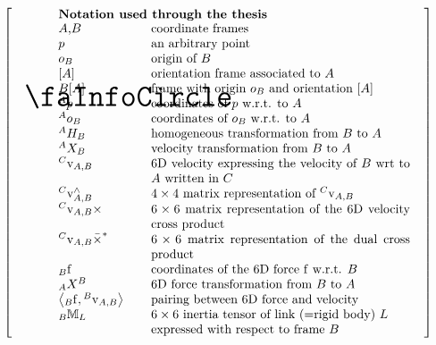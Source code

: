 \[
  \left[
      \begin{tabular}{@{\quad}m{.05\textwidth}@{\quad}m{.83\textwidth}}
        {\Huge \faInfoCircle} &
          \raggedright%
          \textbf{Notation used through the thesis} \par
          \begin{tabular}{@{}p{0.18\textwidth}p{0.60\textwidth}@{}}
          $A$,$B$        & coordinate frames \\
$p$            & an arbitrary point \\
$o_B$          & origin of $B$ \\
$[A]$          & orientation frame associated to $A$ \\
$B[A]$         & frame with origin $o_B$ 
                 and orientation $[A]$ \\
$\ls^Ap$       & coordinates of $p$ 
                 w.r.t. to $A$ \\
$\ls^Ao_B$     & coordinates of $o_B$ w.r.t. to $A$ \\
$\ls^AH_B$     & homogeneous transformation from $B$ to $A$ \\
$\ls^AX_B$     & velocity transformation 
                 from $B$ to $A$  \\
$\ls^C\rmv_{A,B}$ & 6D velocity expressing the velocity of $B$ wrt to $A$
                 written in $C$ \\
$\ls^C\rmv_{A,B}^\wedge$ 
               & $4\times4$ matrix representation of
                 $\ls^C\rmv_{A,B}$\\
$\ls^C\rmv_{A,B}\times$
               & $6\times6$ matrix representation of 
                 the 6D velocity cross product \\
$\ls^C\rmv_{A,B}\bts$
               & $6\times6$ matrix representation of 
                 the dual cross product \\
$\ls_B\rmf$       & coordinates of the 6D force $\rmf$
                 w.r.t. $B$ \\
$\ls_AX^B$     & 6D force transformation 
                 from $B$ to $A$ \\
$\left<\ls_B\rmf, \ls^B\rmv_{A,B}\right>$
               & pairing between 6D force and velocity \\
$\ls_B\bbM_L$  & $6\times6$ inertia tensor of link (=rigid body) $L$\\ & expressed with respect to frame $B$ \\
          \end{tabular}
      \end{tabular}
    \right]
\]



